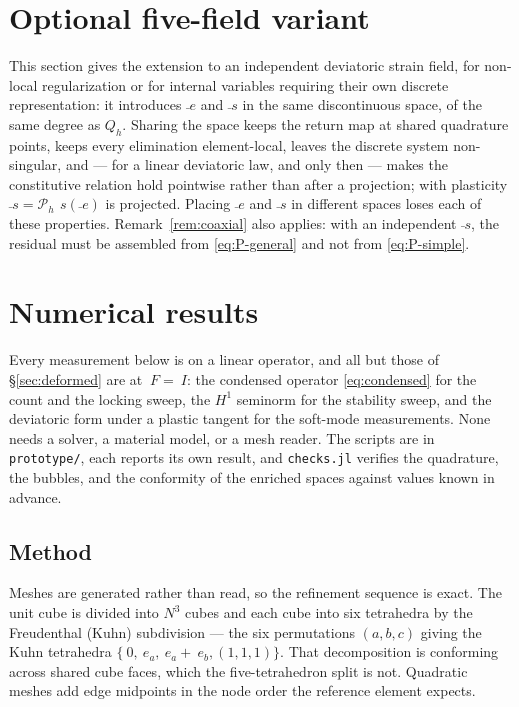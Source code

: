 \documentclass[11pt]{article}
\newcommand{\F}{~F}
\newcommand{\Id}{~I}
\newcommand{\edev}{~e}
\newcommand{\sdev}{~s}
\newcommand{\code}[1]{\texttt{#1}}
\theoremstyle{definition}
\theoremstyle{plain}
\begin{document}
\section{Optional five-field variant}
\label{sec:fivefield}

This section gives the extension to an independent deviatoric strain field,
for non-local regularization or for internal variables requiring their own
discrete representation: it introduces
$\bar\edev$ and $\bar\sdev$ in the same discontinuous space, of the same
degree as $Q_h$. Sharing the space keeps the return map at shared
quadrature points, keeps every elimination element-local, leaves the discrete
system non-singular, and --- for a linear deviatoric law, and only then ---
makes the constitutive relation hold pointwise rather than after a projection;
with plasticity $\bar\sdev = \mathcal{P}_h\,\sdev(\bar\edev)$ is projected. Placing $\bar\edev$ and $\bar\sdev$ in different spaces loses
each of these properties. Remark~\ref{rem:coaxial} also applies: with an
independent $\bar\sdev$, the residual must be assembled from
\eqref{eq:P-general} and not from \eqref{eq:P-simple}.

\section{Numerical results}
\label{sec:results}

Every measurement below is on a linear operator, and all but those of
\S\ref{sec:deformed} are at $\F = \Id$: the condensed operator
\eqref{eq:condensed} for the count and the locking sweep, the $H^1$ seminorm
for the stability sweep, and the deviatoric form under a plastic tangent for
the soft-mode measurements. None needs a solver, a material model,
or a mesh reader. The scripts are in \code{prototype/}, each reports its own
result, and \code{checks.jl} verifies the quadrature, the bubbles, and the
conformity of the enriched spaces against values known in advance.

\subsection{Method}
\label{sec:method}

Meshes are generated rather than read, so the refinement sequence is exact.
The unit cube is divided into $N^3$ cubes and each cube into six tetrahedra by
the Freudenthal (Kuhn) subdivision --- the six permutations $(a,b,c)$ giving
the Kuhn tetrahedra $\{~0, ~e_a, ~e_a + ~e_b, (1,1,1)\}$. That decomposition
is conforming across shared cube faces, which the five-tetrahedron split is
not. Quadratic meshes add edge midpoints in the node
order the reference element expects.
\end{document}
